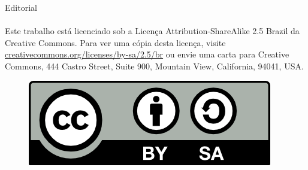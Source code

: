 \begin{editorial}{Editorial}
\paragraph{}
Este trabalho está licenciado sob a Licença Attribution-ShareAlike 2.5 Brazil
da Creative Commons. Para ver uma cópia desta licença,
visite \url{creativecommons.org/licenses/by-sa/2.5/br} ou envie uma
carta para Creative Commons, 444 Castro Street, Suite 900, Mountain View,
California, 94041, USA.
\\
\begin{figure}[H]
    \centering
    \includegraphics{img/cc/by-sa.png}
\end{figure}

\thispagestyle{empty}
\pagebreak
\end{editorial}


